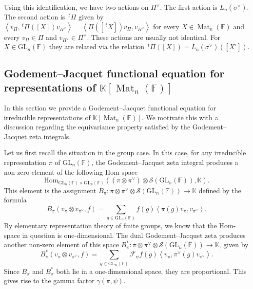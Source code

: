 \documentclass[12pt, reqno]{amsart}
\theoremstyle{definition}
\newcommand{\coefficientsField}{\mathbb{K}}
\newcommand{\Hom}{\mathrm{Hom}}
\newcommand{\transpose}[1]{\, {}^{t}#1}
\newcommand{\innerproduct}[2]{\left\langle #1,#2\right\rangle}
\newcommand{\fieldCharacter}{\psi}
\newcommand{\GL}{\mathrm{GL}}
\newcommand{\finiteField}{\mathbb{F}}
\newcommand{\squareMatrix}{\operatorname{Mat}}
\newcommand{\fourierTransform}[1]{\mathcal{F}_{#1}}
\newcommand{\Schwartz}{\mathcal{S}}
\begin{document}
	Using this identification, we have two actions on $\Pi^{\vee}$. The first action is $L_n\left(\sigma^{\vee}\right)$. The second action is $\transpose{\Pi}$ given by $\innerproduct{v_{\Pi}}{\transpose{\Pi}\left(\left[X\right]\right) v_{\Pi^{\vee}}} = \innerproduct{\Pi\left(\left[\transpose{X}\right]\right) v_{\Pi}}{v_{\Pi^{\vee}}}$ for every $X \in \squareMatrix_n\left(\finiteField\right)$ and every $v_{\Pi} \in \Pi$ and $v_{\Pi^{\vee}} \in \Pi^{\vee}$. These actions are usually not identical. For $X \in \GL_n\left(\finiteField\right)$ they are related via the relation $\transpose{\Pi}\left(\left[X\right]\right) = L_n\left(\sigma^{\vee}\right)\left(\left[X^{\iota}\right]\right)$.
	
	\subsection{Godement--Jacquet functional equation for representations of $\coefficientsField\left[\squareMatrix_n\left(\finiteField\right)\right]$}
	In this section we provide a Godement--Jacquet functional equation for irreducible representations of $\coefficientsField\left[\squareMatrix_n\left(\finiteField\right)\right]$. We motivate this with a discussion regarding the equivariance property satisfied by the Godement--Jacquet zeta integrals.
	
	Let us first recall the situation in the group case. In this case, for any irreducible representation $\pi$ of $\GL_n\left(\finiteField\right)$, the Godement--Jacquet zeta integral produces a non-zero element of the following Hom-space
	\begin{displaymath}
		\Hom_{\GL_n\left(\finiteField\right) \times \GL_n\left(\finiteField\right)}\left(\left(\pi \otimes \pi^{\vee}\right) \otimes \Schwartz\left(\GL_n\left(\finiteField\right)\right), \coefficientsField\right).
	\end{displaymath}
	This element is the assignment
	$B_{\pi} \colon \pi \otimes \pi^{\vee} \otimes \Schwartz\left(\GL_n\left(\finiteField\right)\right) \to \coefficientsField$ defined by the formula
	\begin{displaymath}
		B_{\pi}\left(v_{\pi} \otimes v_{\pi^{\vee}}, f\right) = \sum_{g \in \GL_n\left(\finiteField\right)} f\left(g\right) \innerproduct{\pi\left(g\right) 	v_{\pi}}{v_{\pi^{\vee}}}.
	\end{displaymath}
	By elementary representation theory of finite groups, we know that the Hom-space in question is one-dimensional. The dual Godement--Jacquet zeta produces another non-zero element of this space $B^{\ast}_{\pi} \colon \pi \otimes \pi^{\vee} \otimes \Schwartz\left(\GL_n\left(\finiteField\right)\right) \to \coefficientsField$, given by
	\begin{displaymath}
		B^{\ast}_{\pi}\left(v_{\pi} \otimes 	v_{\pi^{\vee}}, f\right) = \sum_{g \in \GL_n\left(\finiteField\right)} \fourierTransform{\fieldCharacter}f\left(g\right) \innerproduct{v_{\pi}}{\pi^{\vee}\left(g\right) v_{\pi^{\vee}}}.
	\end{displaymath}
	Since $B_\pi$ and $B^{\ast}_{\pi}$ both lie in a one-dimensional space, they are proportional. This gives rise to the gamma factor $\gamma\left(\pi, \fieldCharacter\right)$.
	
\end{document}
